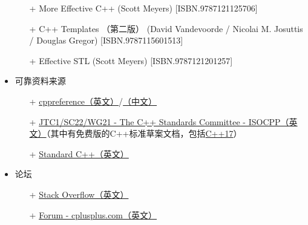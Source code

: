 \begin{itemize}
\begin{itemize}
        \item[+] More Effective C++ (Scott Meyers) [ISBN.9787121125706]
        \item[+] C++ Templates （第二版） (David Vandevoorde / Nicolai M. Josuttis / Douglas Gregor) [ISBN.9787115601513]
        \item[+] Effective STL (Scott Meyers) [ISBN.9787121201257]
    \end{itemize}
    \item 可靠资料来源
    \begin{itemize}
        \item[+] \href{https://en.cppreference.com/w/}{cppreference（英文）}/\href{https://zh.cppreference.com/w/}{（中文）}
        \item[+] \href{https://www.open-std.org/jtc1/sc22/wg21/}{JTC1/SC22/WG21 - The C++ Standards Committee - ISOCPP（英文）}（其中有免费版的C++标准草案文档，包括\href{https://www.open-std.org/jtc1/sc22/wg21/docs/papers/2017/n4659.pdf}{C++17}）
        \item[+] \href{https://isocpp.org/}{Standard C++（英文）}
    \end{itemize}
    \item 论坛
    \begin{itemize}
        \item[+] \href{https://stackoverflow.com/}{Stack Overflow（英文）}
        \item[+] \href{https://cplusplus.com/forum/}{Forum - cplusplus.com（英文）}
    \end{itemize}
\end{itemize}